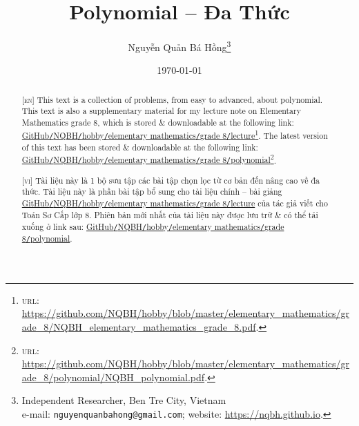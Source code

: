 \documentclass{article}
\title{Polynomial -- Đa Thức}
\author{Nguyễn Quản Bá Hồng\footnote{Independent Researcher, Ben Tre City, Vietnam\\e-mail: \texttt{nguyenquanbahong@gmail.com}; website: \url{https://nqbh.github.io}.}}
\date{\today}
\numberwithin{equation}{section}
\begin{document}
\maketitle
\begin{abstract}
	\textsc{[en]} This text is a collection of problems, from easy to advanced, about polynomial. This text is also a supplementary material for my lecture note on Elementary Mathematics grade 8, which is stored \& downloadable at the following link: \href{https://github.com/NQBH/hobby/blob/master/elementary_mathematics/grade_8/NQBH_elementary_mathematics_grade_8.pdf}{GitHub\texttt{/}NQBH\texttt{/}hobby\texttt{/}elementary mathematics\texttt{/}grade 8\texttt{/}lecture}\footnote{\textsc{url}: \url{https://github.com/NQBH/hobby/blob/master/elementary_mathematics/grade_8/NQBH_elementary_mathematics_grade_8.pdf}.}. The latest version of this text has been stored \& downloadable at the following link: \href{https://github.com/NQBH/hobby/blob/master/elementary_mathematics/grade_8/polynomial/NQBH_polynomial.pdf}{GitHub\texttt{/}NQBH\texttt{/}hobby\texttt{/}elementary mathematics\texttt{/}grade 8\texttt{/}polynomial}\footnote{\textsc{url}: \url{https://github.com/NQBH/hobby/blob/master/elementary_mathematics/grade_8/polynomial/NQBH_polynomial.pdf}.}.
	\vspace{2mm}
	
	\textsc{[vi]} Tài liệu này là 1 bộ sưu tập các bài tập chọn lọc từ cơ bản đến nâng cao về đa thức. Tài liệu này là phần bài tập bổ sung cho tài liệu chính -- bài giảng \href{https://github.com/NQBH/hobby/blob/master/elementary_mathematics/grade_8/NQBH_elementary_mathematics_grade_8.pdf}{GitHub\texttt{/}NQBH\texttt{/}hobby\texttt{/}elementary mathematics\texttt{/}grade 8\texttt{/}lecture} của tác giả viết cho Toán Sơ Cấp lớp 8. Phiên bản mới nhất của tài liệu này được lưu trữ \& có thể tải xuống ở link sau: \href{https://github.com/NQBH/hobby/blob/master/elementary_mathematics/grade_8/polynomial/NQBH_polynomial.pdf}{GitHub\texttt{/}NQBH\texttt{/}hobby\texttt{/}elementary mathematics\texttt{/}grade 8\texttt{/}polynomial}.
\end{abstract}
\setcounter{secnumdepth}{4}
\setcounter{tocdepth}{3}
\tableofcontents

\end{document}
